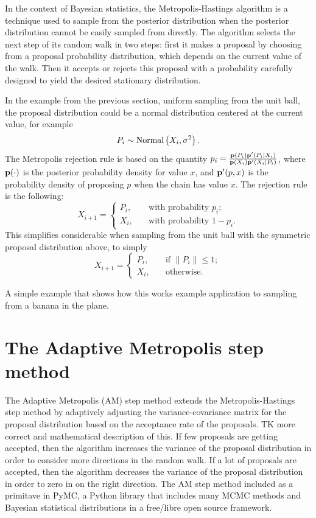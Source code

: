 In the context of Bayesian statistics, the Metropolis-Hastings
algorithm is a technique used to sample from the posterior
distribution when the posterior distribution cannot be easily sampled
from directly. The algorithm selects the next step of its random walk
in two steps: first it makes a proposal by choosing from a proposal
probability distribution, which depends on the current value of the
walk. Then it accepts or rejects this proposal with a probability
carefully designed to yield the desired stationary distribution.

In the example from the previous section, uniform sampling from the
unit ball, the proposal distribution could be a normal distribution centered at the current value, for example
\[
P_i \sim \operatorname{Normal}\left(X_i, \sigma^2\right).
\]
The Metropolis rejection rule is based on the quantity $p_i =
\frac{\mathbf{p}(P_i)\mathbf{p}'(P_i|X_i)}{\mathbf{p}(X_i)\mathbf{p}'(X_i|P_i)}$, where
$\mathbf{p}(\cdot)$ is the posterior probability density for value $x$, and
$\mathbf{p}'(p, x)$ is the probability density of proposing $p$ when the
chain has value $x$.  The rejection rule is the following:
\[
X_{i+1} = \begin{cases}
P_i, &\quad\text{with probability } p_i;\\
X_i, &\quad\text{with probability } 1-p_i.
\end{cases}
\]
This simplifies considerable when sampling from the unit ball with the
symmetric proposal distribution above, to simply
\[
X_{i+1} = \begin{cases}
P_i , &\quad\text{if }\|P_i\| \leq 1;\\
X_i, &\quad\text{otherwise}.
\end{cases}
\]

A simple example that shows how this works example application to sampling from a banana in the plane.

\section{The Adaptive Metropolis step method}
The Adaptive Metropolis (AM) step method extends the
Metropolis-Hastings step method by adaptively adjusting the
variance-covariance matrix for the proposal distribution based on the
acceptance rate of the proposals.\cite{Harrio_paper_cited_in_PyMC} TK
more correct and mathematical description of this. If few proposals
are getting accepted, then the algorithm increases the variance of the
proposal distribution in order to consider more directions in the
random walk. If a lot of proposals are accepted, then the algorithm
decreases the variance of the proposal distribution in order to zero
in on the right direction. The AM step method included as a primitave
in PyMC, a Python library that includes many MCMC methods and Bayesian
statistical distributions in a free/libre open source
framework.\cite{Patil_PyMC_2010}


